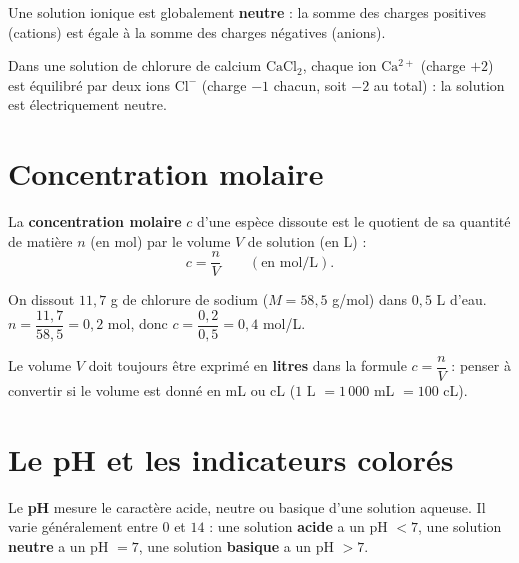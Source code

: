 \begin{propriete}[Électroneutralité]
Une solution ionique est globalement \textbf{neutre} : la somme des charges positives
(cations) est égale à la somme des charges négatives (anions).
\end{propriete}

\begin{exemple}
Dans une solution de chlorure de calcium $\mathrm{CaCl_2}$, chaque ion $\mathrm{Ca^{2+}}$
(charge $+2$) est équilibré par deux ions $\mathrm{Cl^-}$ (charge $-1$ chacun, soit $-2$ au
total) : la solution est électriquement neutre.
\end{exemple}

\section{Concentration molaire}

\begin{definition}
La \textbf{concentration molaire} $c$ d'une espèce dissoute est le quotient de sa quantité
de matière $n$ (en mol) par le volume $V$ de solution (en L) :
\[
c=\frac nV \qquad(\text{en mol/L}).
\]
\end{definition}

\begin{exemple}
On dissout $11{,}7$ g de chlorure de sodium ($M=58{,}5$ g/mol) dans $0{,}5$ L d'eau.
$n=\dfrac{11{,}7}{58{,}5}=0{,}2$ mol, donc $c=\dfrac{0{,}2}{0{,}5}=0{,}4$ mol/L.
\end{exemple}

\begin{remarque}
Le volume $V$ doit toujours être exprimé en \textbf{litres} dans la formule $c=\dfrac nV$ :
penser à convertir si le volume est donné en mL ou cL ($1$ L $=1\,000$ mL $=100$ cL).
\end{remarque}

\section{Le pH et les indicateurs colorés}

\begin{definition}[pH]
Le \textbf{pH} mesure le caractère acide, neutre ou basique d'une solution aqueuse. Il
varie généralement entre $0$ et $14$ : une solution \textbf{acide} a un pH $<7$, une
solution \textbf{neutre} a un pH $=7$, une solution \textbf{basique} a un pH $>7$.
\end{definition}

